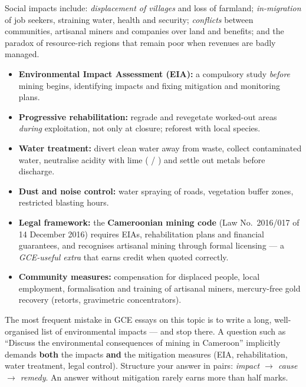 \documentclass[11pt]{article}
\begin{document}
Social impacts include: \emph{displacement of villages} and loss of farmland; \emph{in-migration} of job seekers, straining water, health and security; \emph{conflicts} between communities, artisanal miners and companies over land and benefits; and the paradox of resource-rich regions that remain poor when revenues are badly managed.

\begin{aretenir}
\begin{itemize}
\item \textbf{Environmental Impact Assessment (EIA):} a compulsory study \emph{before} mining begins, identifying impacts and fixing mitigation and monitoring plans.
\item \textbf{Progressive rehabilitation:} regrade and revegetate worked-out areas \emph{during} exploitation, not only at closure; reforest with local species.
\item \textbf{Water treatment:} divert clean water away from waste, collect contaminated water, neutralise acidity with lime ( / ) and settle out metals before discharge.
\item \textbf{Dust and noise control:} water spraying of roads, vegetation buffer zones, restricted blasting hours.
\item \textbf{Legal framework:} the \textbf{Cameroonian mining code} (Law No.\ 2016/017 of 14 December 2016) requires EIAs, rehabilitation plans and financial guarantees, and recognises artisanal mining through formal licensing --- a \emph{GCE-useful extra} that earns credit when quoted correctly.
\item \textbf{Community measures:} compensation for displaced people, local employment, formalisation and training of artisanal miners, mercury-free gold recovery (retorts, gravimetric concentrators).
\end{itemize}
\end{aretenir}

\begin{attention}
The most frequent mistake in GCE essays on this topic is to write a long, well-organised list of environmental impacts --- and stop there. A question such as ``Discuss the environmental consequences of mining in Cameroon'' implicitly demands \textbf{both} the impacts \textbf{and} the mitigation measures (EIA, rehabilitation, water treatment, legal control). Structure your answer in pairs: \emph{impact $\rightarrow$ cause $\rightarrow$ remedy}. An answer without mitigation rarely earns more than half marks.
\end{attention}
\end{document}
